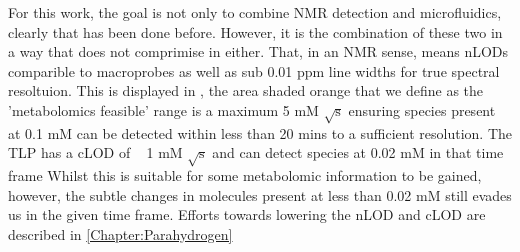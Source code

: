 For this work, the goal is not only to combine NMR detection and microfluidics, clearly that has been done before. However,
it is the combination of these two in a way that does not comprimise in either. That, in an NMR sense, means nLODs
comparible to macroprobes as well as sub 0.01 ppm line widths for true spectral resoltuion. This is displayed in
, the area shaded orange that we define as the 'metabolomics feasible' range is a maximum 5 mM $\sqrt{\text{s}}$
ensuring species present at 0.1 mM can be detected within less than 20 mins to a sufficient resolution. The TLP has a cLOD of
~ 1 mM $\sqrt{\text{s}}$ and can detect species at 0.02 mM in that time frame Whilst this is suitable for some metabolomic information to be
gained, however, the subtle changes in molecules present at less than 0.02 mM still evades us in the given time frame. Efforts towards
lowering the nLOD and cLOD are described in \ref{Chapter:Parahydrogen}
